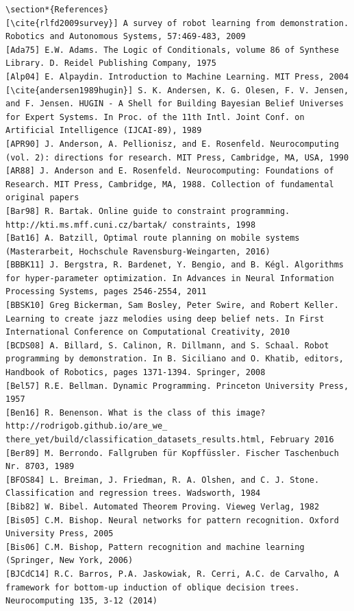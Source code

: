\documentclass[10pt]{article}
\begin{document}
\begin{verbatim}
\section*{References}
[\cite{rlfd2009survey}] A survey of robot learning from demonstration. Robotics and Autonomous Systems, 57:469-483, 2009
[Ada75] E.W. Adams. The Logic of Conditionals, volume 86 of Synthese Library. D. Reidel Publishing Company, 1975
[Alp04] E. Alpaydin. Introduction to Machine Learning. MIT Press, 2004
[\cite{andersen1989hugin}] S. K. Andersen, K. G. Olesen, F. V. Jensen, and F. Jensen. HUGIN - A Shell for Building Bayesian Belief Universes for Expert Systems. In Proc. of the 11th Intl. Joint Conf. on Artificial Intelligence (IJCAI-89), 1989
[APR90] J. Anderson, A. Pellionisz, and E. Rosenfeld. Neurocomputing (vol. 2): directions for research. MIT Press, Cambridge, MA, USA, 1990
[AR88] J. Anderson and E. Rosenfeld. Neurocomputing: Foundations of Research. MIT Press, Cambridge, MA, 1988. Collection of fundamental original papers
[Bar98] R. Bartak. Online guide to constraint programming. http://kti.ms.mff.cuni.cz/bartak/ constraints, 1998
[Bat16] A. Batzill, Optimal route planning on mobile systems (Masterarbeit, Hochschule Ravensburg-Weingarten, 2016)
[BBBK11] J. Bergstra, R. Bardenet, Y. Bengio, and B. Kégl. Algorithms for hyper-parameter optimization. In Advances in Neural Information Processing Systems, pages 2546-2554, 2011
[BBSK10] Greg Bickerman, Sam Bosley, Peter Swire, and Robert Keller. Learning to create jazz melodies using deep belief nets. In First International Conference on Computational Creativity, 2010
[BCDS08] A. Billard, S. Calinon, R. Dillmann, and S. Schaal. Robot programming by demonstration. In B. Siciliano and O. Khatib, editors, Handbook of Robotics, pages 1371-1394. Springer, 2008
[Bel57] R.E. Bellman. Dynamic Programming. Princeton University Press, 1957
[Ben16] R. Benenson. What is the class of this image? http://rodrigob.github.io/are_we_ there_yet/build/classification_datasets_results.html, February 2016
[Ber89] M. Berrondo. Fallgruben für Kopffüssler. Fischer Taschenbuch Nr. 8703, 1989
[BFOS84] L. Breiman, J. Friedman, R. A. Olshen, and C. J. Stone. Classification and regression trees. Wadsworth, 1984
[Bib82] W. Bibel. Automated Theorem Proving. Vieweg Verlag, 1982
[Bis05] C.M. Bishop. Neural networks for pattern recognition. Oxford University Press, 2005
[Bis06] C.M. Bishop, Pattern recognition and machine learning (Springer, New York, 2006)
[BJCdC14] R.C. Barros, P.A. Jaskowiak, R. Cerri, A.C. de Carvalho, A framework for bottom-up induction of oblique decision trees. Neurocomputing 135, 3-12 (2014)

\end{verbatim}
\end{document}
